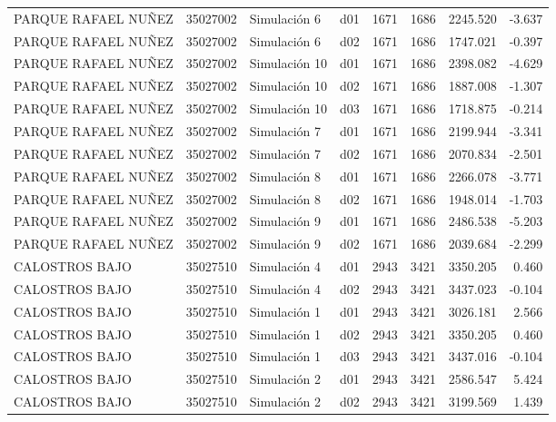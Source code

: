 \begin{landscape}
\begin{longtable}{lrlp{2cm}p{2cm}p{3cm}p{2cm}r}
     PARQUE RAFAEL NUÑEZ &  35027002 &   Simulación 6 &   d01 &      1671 &     1686 &  2245.520 &    -3.637 \\
     PARQUE RAFAEL NUÑEZ &  35027002 &   Simulación 6 &   d02 &      1671 &     1686 &  1747.021 &    -0.397 \\
     PARQUE RAFAEL NUÑEZ &  35027002 &  Simulación 10 &   d01 &      1671 &     1686 &  2398.082 &    -4.629 \\
     PARQUE RAFAEL NUÑEZ &  35027002 &  Simulación 10 &   d02 &      1671 &     1686 &  1887.008 &    -1.307 \\
     PARQUE RAFAEL NUÑEZ &  35027002 &  Simulación 10 &   d03 &      1671 &     1686 &  1718.875 &    -0.214 \\
     PARQUE RAFAEL NUÑEZ &  35027002 &   Simulación 7 &   d01 &      1671 &     1686 &  2199.944 &    -3.341 \\
     PARQUE RAFAEL NUÑEZ &  35027002 &   Simulación 7 &   d02 &      1671 &     1686 &  2070.834 &    -2.501 \\
     PARQUE RAFAEL NUÑEZ &  35027002 &   Simulación 8 &   d01 &      1671 &     1686 &  2266.078 &    -3.771 \\
     PARQUE RAFAEL NUÑEZ &  35027002 &   Simulación 8 &   d02 &      1671 &     1686 &  1948.014 &    -1.703 \\
     PARQUE RAFAEL NUÑEZ &  35027002 &   Simulación 9 &   d01 &      1671 &     1686 &  2486.538 &    -5.203 \\
     PARQUE RAFAEL NUÑEZ &  35027002 &   Simulación 9 &   d02 &      1671 &     1686 &  2039.684 &    -2.299 \\
          CALOSTROS BAJO &  35027510 &   Simulación 4 &   d01 &      2943 &     3421 &  3350.205 &     0.460 \\
          CALOSTROS BAJO &  35027510 &   Simulación 4 &   d02 &      2943 &     3421 &  3437.023 &    -0.104 \\
          CALOSTROS BAJO &  35027510 &   Simulación 1 &   d01 &      2943 &     3421 &  3026.181 &     2.566 \\
          CALOSTROS BAJO &  35027510 &   Simulación 1 &   d02 &      2943 &     3421 &  3350.205 &     0.460 \\
          CALOSTROS BAJO &  35027510 &   Simulación 1 &   d03 &      2943 &     3421 &  3437.016 &    -0.104 \\
          CALOSTROS BAJO &  35027510 &   Simulación 2 &   d01 &      2943 &     3421 &  2586.547 &     5.424 \\
          CALOSTROS BAJO &  35027510 &   Simulación 2 &   d02 &      2943 &     3421 &  3199.569 &     1.439 \\

\end{longtable}
\end{landscape}
